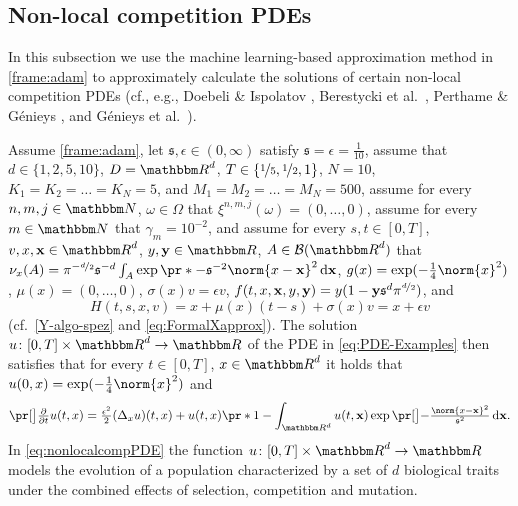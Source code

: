 \subsection{Non-local competition PDEs}
\label{subsec:nonlocalcompPDE}
%
In this subsection we use the machine learning-based approximation method in \cref{frame:adam}
to approximately calculate the solutions of certain non-local competition PDEs (cf., e.g., Doebeli \& Ispolatov \citep{Doebeli2010}, Berestycki et al.~\citep{Berestycki2009b}, Perthame \& Génieys \citep{Perthame2007}, and Génieys et al.~\citep{Genieys2006a}).
%

Assume 
	\cref{frame:adam}, 
let
	$\mathfrak s,\epsilon\in(0,\infty)$
satisfy
	$\mathfrak{s} = \epsilon =\tfrac{1}{10}$,
assume that
	$d\in\{1,2,5,10\}$,
	$\D = \R^d$,
	$T\in\{\nicefrac{1}{5},\nicefrac{1}{2},1\}$,
	$N=10$,
	$K_1 = K_2 = \ldots = K_N= 5$, and
	$M_1 = M_2 = \ldots = M_N = 500$,
assume 
	for every 
		$n,m,j\in \N$, $\omega \in \Omega$ 
	that 
		$\xi^{n,m,j}(\omega)=(0,\dots,0)$,
assume
	for every 
		$m \in \N$
	that
		$\gamma_m = 10^{-2}$,
and assume 
	for every 
		$s,t \in [0,T]$, 
		$v,x,\mathbf{x}%
		\in \R^d$, 
		$y,\mathbf{y} \in \R$,
		$A \in \mathcal{B}(\R^d)$
	that
		$\nu_x(A) = \pi^{-\nicefrac{d}{2}}\mathfrak{s}^{-d}\int_A \exp\pr*{-\mathfrak{s}^{-2}\norm{x - \mathbf{x}}^2}\,\diff\mathbf{x}$,
		$g(x)= \exp (-\tfrac{1}{4}\norm{x}^2)$,
		$\mu(x)=(0,\dots,0)$,
		$\sigma(x) v=\epsilon v$, 
		$f(t,x,\mathbf{x},y,\mathbf{y}%
		)=  y(1 - \mathbf{y} \mathfrak{s}^d\pi^{\nicefrac{d}{2}})$, and
	\begin{equation}
		\label{eq:Hcomp}
		H(t,s,x,v)
		=
		x + \mu(x)(t-s)+ \sigma(x)v
		=
		x+\epsilon v
	\end{equation}
	(cf.\ \eqref{Y-algo-spez} and \eqref{eq:FormalXapprox}).
The solution 
	$u\colon[0,T]\times \R^d \to \R$ 
	of the PDE in \eqref{eq:PDE-Examples} then satisfies that 
		for every
			$t\in [0,T]$, $x\in\R^d$ 
		it holds that 
			$u(0,x)=\exp (-\tfrac{1}{4}\norm{x}^2)$ and
		\begin{equation}
			\label{eq:nonlocalcompPDE}
 			\bpr{\tfrac{\partial}{\partial t}u}(t,x)
 			=
 			\tfrac{\epsilon^2}{2}(\Delta_x u)(t,x) + u(t,x) \pr*{1 - \int_{\R^d} u(t,\mathbf{x}) \exp \bpr{-\tfrac{\norm{x-\mathbf{x}}^2}{\mathfrak{s}^2} } \, \diff \mathbf{x} }
			.
		\end{equation}
%
%
In \eqref{eq:nonlocalcompPDE} the function $u\colon[0,T]\times\R^d\to\R$ models the evolution of a population characterized by a set of $d$ biological traits under the combined effects of selection, competition and mutation. 
